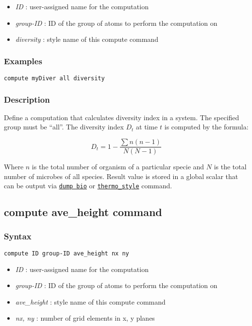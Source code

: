 \documentclass[11pt,a4paper,openright]{article}
\begin{document}
\begin{itemize}  [nosep]
\item
	{\it ID }: user-assigned name for the computation
\item
	{\it group-ID }: ID of the group of atoms to perform the computation on
\item
	{\it diversity }: style name of this compute command
\end{itemize}

\subsubsection*{Examples}

\begin{Verbatim}[frame=single]
compute myDiver all diversity
\end{Verbatim}

\subsubsection*{Description}

Define a computation that calculates
diversity index in a system. 
The specified group must be ``all''.
The diversity index $D_t$
at time $t$ is computed by the formula:

\[ D_t = 1 - \frac{\sum n(n-1)}{N(N-1)} \] 

Where $n$ is the total number of organism of a particular specie and $N$
is the total number of microbes of all species.  
Result value is stored in 
a global scalar that can be output via \hyperref[dumpbio]{\tt dump bio}
or \href{http://lammps.sandia.gov/doc/thermo_style.html}{\tt thermo\_style} command.


\newpage
\subsection{compute ave\_height command}
\label{caveheight}

\subsubsection*{Syntax}
\begin{Verbatim}[frame=single]
compute ID group-ID ave_height nx ny
\end{Verbatim}

\begin{itemize}  [nosep]
\item
	{\it ID }: user-assigned name for the computation
\item
	{\it group-ID }: ID of the group of atoms to perform the computation on
\item
	{\it ave\_height }: style name of this compute command
\item
	{\it nx, ny }: number of grid elements in x, y planes
\end{itemize}
\end{document}
